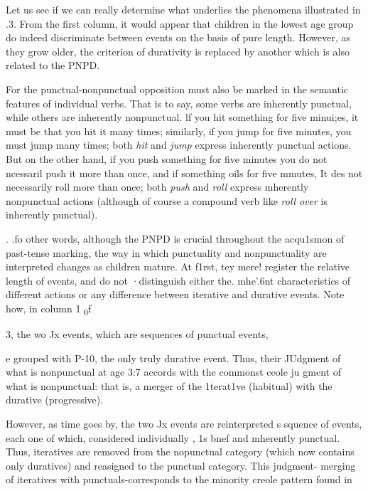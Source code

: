 Let us see if we can really determine what underlies the phenomena illustrated in .3. From the first column, it would appear that children in the lowest age group do indeed discriminate between events on the basis of pure length. However, as they grow older, the criterion of durativity is replaced by another which is also related to the PNPD.

For the punctual-nonpunctual opposition must also be marked in the semantic features of individual verbs. That is to say, some verbs are inherently punctual, while others are inherently nonpunctual. lf you hit something for five minui;es, it must be that you hit it many
times; similarly, if you jump for five minutes, you must jump many times; both \textit{hit} and \textit{jump} express inherently punctual actions. But on the other hand, if you push something for five minutes you do not ncessaril push it more than once, and if something oils for five mmutes, It des not necessarily roll more than once; both \textit{push} and \textit{roll} express mherently nonpunctual actions (although of course a compound verb like \textit{roll} \textit{over} is inherently punctual).

. .fo other words, although the PNPD is crucial throughout the acqu1smon of past-tense marking, the way in which punctuality and nonpunctuality are interpreted changes as children mature. At f1rst, tey mere! register the relative length of events, and do not ·distinguish either the. mhe'.{\textquotedbl}6nt characteristics of different actions or any difference between iterative and durative events. Note how, in column 1 \textsubscript{0}f

\begin{table}
\caption{3, the wo Jx events, which are sequences of punctual events,}
\label{tab:3}
\end{table}

e grouped with P-10, the only truly durative event. Thus, their JUdgment of what is nonpunctual at age 3:7 accords with the common\-st ceole ju gment of what is nonpunctual: that is, a merger of the 1terat1ve (habitual) with the durative (progressive).

However, as time goes by, the two Jx events are reinterpreted s squence of events, each one of which, considered individually , 1s bnef and mherently punctual. Thus, iteratives are removed from the nopunctual category (which now contains only duratives) and re\-asigned to the punctual category. This judgment- merging of iteratives with punctuals-corresponds to the minority creole pattern found in

